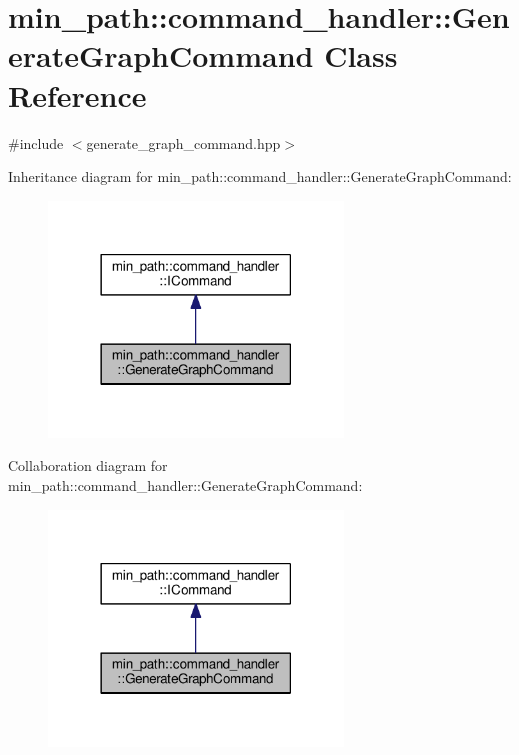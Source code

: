 \hypertarget{classmin__path_1_1command__handler_1_1_generate_graph_command}{}\section{min\+\_\+path\+:\+:command\+\_\+handler\+:\+:Generate\+Graph\+Command Class Reference}
\label{classmin__path_1_1command__handler_1_1_generate_graph_command}


{\ttfamily \#include $<$generate\+\_\+graph\+\_\+command.\+hpp$>$}



Inheritance diagram for min\+\_\+path\+:\+:command\+\_\+handler\+:\+:Generate\+Graph\+Command\+:
\nopagebreak
\begin{figure}[H]
\begin{center}
\leavevmode
\includegraphics[width=222pt]{classmin__path_1_1command__handler_1_1_generate_graph_command__inherit__graph}
\end{center}
\end{figure}


Collaboration diagram for min\+\_\+path\+:\+:command\+\_\+handler\+:\+:Generate\+Graph\+Command\+:
\nopagebreak
\begin{figure}[H]
\begin{center}
\leavevmode
\includegraphics[width=222pt]{classmin__path_1_1command__handler_1_1_generate_graph_command__coll__graph}
\end{center}
\end{figure}

